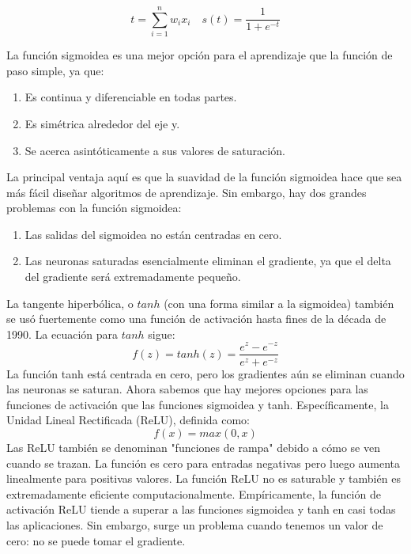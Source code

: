 \documentclass[a4paper,12pt]{article}
\begin{document}
\begin{equation}
	t=\sum_{i=1}^{n}w_ix_i \quad s(t)=\frac{1}{1+e^{-t}}
\end{equation}

La función sigmoidea es una mejor opción para el aprendizaje que la función de paso simple, ya que:
\begin{enumerate}[noitemsep, topsep=2pt]
	\item Es continua y diferenciable en todas partes.
	\item Es simétrica alrededor del eje y.
	\item Se acerca asintóticamente a sus valores de saturación.
\end{enumerate}
La principal ventaja aquí es que la suavidad de la función sigmoidea hace que sea más fácil diseñar algoritmos de aprendizaje. Sin embargo, hay dos grandes problemas con la función sigmoidea:
\begin{enumerate}[noitemsep, topsep=2pt]
	\item Las salidas del sigmoidea no están centradas en cero.
	\item Las neuronas saturadas esencialmente eliminan el gradiente, ya que el delta del gradiente será extremadamente pequeño.
\end{enumerate}

La tangente hiperbólica, o $tanh$ (con una forma similar a la sigmoidea) también se usó fuertemente como una función de activación hasta fines de la década de 1990.
La ecuación para $tanh$ sigue:
\begin{equation}
	f(z) = tanh(z) = \frac{e^z - e^{-z}}{e^z + e^{-z}}
\end{equation}
La función tanh está centrada en cero, pero los gradientes aún se eliminan cuando las neuronas se saturan.
Ahora sabemos que hay mejores opciones para las funciones de activación que las funciones sigmoidea y tanh. Específicamente, la Unidad Lineal Rectificada (ReLU), definida como:
\begin{equation}
	f(x) = max(0, x)
\end{equation}
Las ReLU también se denominan "funciones de rampa" debido a cómo se ven cuando se trazan. La función es cero para entradas negativas pero luego aumenta linealmente para positivas valores. La función ReLU no es saturable y también es extremadamente  eficiente computacionalmente.
Empíricamente, la función de activación ReLU tiende a superar a las funciones sigmoidea y tanh en casi todas las aplicaciones. Sin embargo, surge un problema cuando tenemos un valor de cero: no se puede tomar el gradiente.
\end{document}
